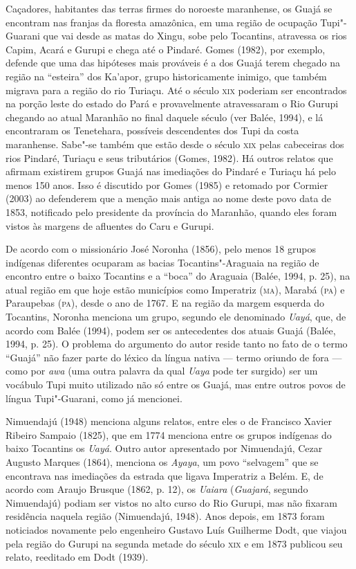 Caçadores, habitantes das terras firmes do noroeste maranhense, os Guajá
se encontram nas franjas da floresta amazônica, em uma região de
ocupação Tupi"-Guarani que vai desde as matas do Xingu, sobe pelo
Tocantins, atravessa os rios Capim, Acará e Gurupi e chega até o
Pindaré. Gomes (1982), por exemplo, defende que uma das hipóteses mais
prováveis é a dos Guajá terem chegado na região na ``esteira'' dos
Ka'apor, grupo historicamente inimigo, que também migrava para a região
do rio Turiaçu. Até o século \textsc{xix} poderiam ser encontrados na porção
leste do estado do Pará e provavelmente atravessaram o Rio Gurupi
chegando ao atual Maranhão no final daquele século (ver Balée, 1994), e
lá encontraram os Tenetehara, possíveis descendentes dos Tupi da costa
maranhense. Sabe"-se também que estão desde o século \textsc{xix} pelas cabeceiras
dos rios Pindaré, Turiaçu e seus tributários (Gomes, 1982). Há outros
relatos que afirmam existirem grupos Guajá nas imediações do Pindaré e
Turiaçu há pelo menos 150 anos. Isso é discutido por Gomes (1985) e
retomado por Cormier (2003) ao defenderem que a menção mais antiga ao
nome deste povo data de 1853, notificado pelo presidente da província do
Maranhão, quando eles foram vistos às margens de afluentes do Caru e
Gurupi.

De acordo com o missionário José Noronha (1856), pelo menos 18 grupos
indígenas diferentes ocuparam as bacias Tocantins"-Araguaia na região de
encontro entre o baixo Tocantins e a ``boca'' do Araguaia (Balée, 1994,
p. 25), na atual região em que hoje estão municípios como Imperatriz
(\textsc{ma}), Marabá (\textsc{pa}) e Paraupebas (\textsc{pa}), desde
o ano de 1767. E na região da
margem esquerda do Tocantins, Noronha menciona um grupo, segundo ele
denominado \emph{Uayá}, que, de acordo com Balée (1994), podem ser os
antecedentes dos atuais Guajá (Balée, 1994, p. 25). O problema do
argumento do autor reside tanto no fato de o termo ``Guajá'' não fazer
parte do léxico da língua nativa --- termo oriundo de fora --- como por
\emph{awa} (uma outra palavra da qual \emph{Uaya} pode ter surgido) ser
um vocábulo Tupi muito utilizado não só entre os Guajá, mas entre outros
povos de língua Tupi"-Guarani, como já mencionei.

Nimuendajú (1948) menciona alguns relatos, entre eles o de Francisco
Xavier Ribeiro Sampaio (1825), que em 1774 menciona entre os grupos
indígenas do baixo Tocantins os \emph{Uayá}. Outro autor apresentado por
Nimuendajú, Cezar Augusto Marques (1864), menciona os \emph{Ayaya}, um
povo ``selvagem'' que se encontrava nas imediações da estrada que ligava
Imperatriz a Belém. E, de acordo com Araujo Brusque (1862, p. 12), os
\emph{Uaiara} (\emph{Guajará}, segundo Nimuendajú) podiam ser vistos no
alto curso do Rio Gurupi, mas não fixaram residência naquela região
(Nimuendajú, 1948). Anos depois, em 1873 foram noticiados novamente pelo
engenheiro Gustavo Luís Guilherme Dodt, que viajou pela região do Gurupi
na segunda metade do século \textsc{xix} e em 1873 publicou seu relato, reeditado
em Dodt (1939).

